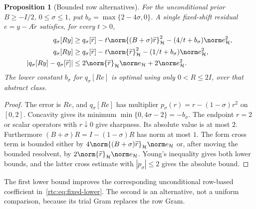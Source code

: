 \documentclass[11pt,a4paper]{article}
\numberwithin{equation}{section}
\newtheorem{proposition}[theorem]{Proposition}
\theoremstyle{definition}\newtheorem{definition}[theorem]{Definition}
\theoremstyle{remark}\newtheorem{remark}[theorem]{Remark}
\newcommand{\Hh}{\mathcal H}\newcommand{\Hw}{\mathcal H}
\begin{document}
\begin{proposition}[Bounded row alternatives]\label{rtc:prop:row-free}
For the unconditional prior $B\ge-I/2$, $0\le\sigma\le1$, put
$b_\sigma=\max\{2-4\sigma,0\}$. A single fixed-shift residual
$e=y-A\widetilde r$ satisfies, for every $t>0$,
\begin{align}\label{rtc:eq:row-free-single}
 q_\sigma[Ry]&\ge q_\sigma[\widetilde r]
 -t\norm{(B+\sigma)\widetilde r}_{\Hh}^2
 -(4/t+b_\sigma)\norm e_{\Hh}^2,\notag\\
 q_\sigma[Ry]&\ge q_\sigma[\widetilde r]
 -t\norm{\widetilde r}_{\Hh}^2
 -(1/t+b_\sigma)\norm e_{\Hh}^2,\\
 |q_\sigma[Ry]-q_\sigma[\widetilde r]|
 &\le2\norm{\widetilde r}_{\Hh}\norm e_{\Hh}
               +2\norm e_{\Hh}^2.\notag
\end{align}
The lower constant $b_\sigma$ for $q_\sigma[Re]$ is optimal using
only $0<R\le2I$, over that abstract class.
\end{proposition}
\begin{proof}
The error is $Re$, and $q_\sigma[Re]$ has multiplier
$p_\sigma(r)=r-(1-\sigma)r^2$ on $[0,2]$.
Concavity gives its minimum $\min\{0,4\sigma-2\}=-b_\sigma$.
The endpoint $r=2$ or scalar operators with $r\downarrow0$ give sharpness.
Its absolute value is at most $2$. Furthermore
$(B+\sigma)R=I-(1-\sigma)R$ has norm at most $1$.
The form cross term is bounded either by
$4\norm{(B+\sigma)\widetilde r}_{\Hh}\norm e_{\Hh}$
or, after moving the bounded resolvent, by
$2\norm{\widetilde r}_{\Hh}\norm e_{\Hh}$.
Young's inequality gives both lower bounds, and the latter cross estimate
with $|p_\sigma|\le2$ gives the absolute bound.
\end{proof}
The first lower bound improves the corresponding unconditional row-based
coefficient in~\eqref{rtc:eq:fixed-lower}. The second is an alternative,
not a uniform comparison, because its trial Gram replaces the row Gram.
\end{document}

